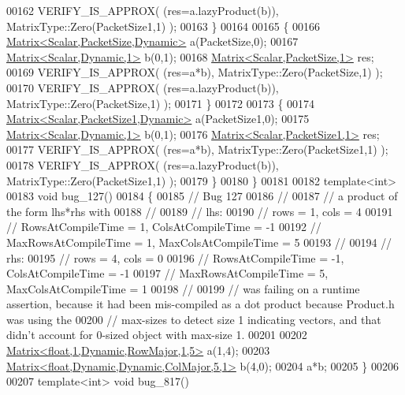 \begin{DoxyCode}
00162     VERIFY\_IS\_APPROX( (res=a.lazyProduct(b)), MatrixType::Zero(PacketSize1,1) );
00163   \}
00164   
00165   \{
00166     \hyperlink{group___core___module_class_eigen_1_1_matrix}{Matrix<Scalar,PacketSize,Dynamic>} a(PacketSize,0);
00167     \hyperlink{group___core___module}{Matrix<Scalar,Dynamic,1>} b(0,1);
00168     \hyperlink{group___core___module_class_eigen_1_1_matrix}{Matrix<Scalar,PacketSize,1>} res;
00169     VERIFY\_IS\_APPROX( (res=a*b), MatrixType::Zero(PacketSize,1) );
00170     VERIFY\_IS\_APPROX( (res=a.lazyProduct(b)), MatrixType::Zero(PacketSize,1) );
00171   \}
00172   
00173   \{
00174     \hyperlink{group___core___module_class_eigen_1_1_matrix}{Matrix<Scalar,PacketSize1,Dynamic>} a(PacketSize1,0);
00175     \hyperlink{group___core___module}{Matrix<Scalar,Dynamic,1>} b(0,1);
00176     \hyperlink{group___core___module_class_eigen_1_1_matrix}{Matrix<Scalar,PacketSize1,1>} res;
00177     VERIFY\_IS\_APPROX( (res=a*b), MatrixType::Zero(PacketSize1,1) );
00178     VERIFY\_IS\_APPROX( (res=a.lazyProduct(b)), MatrixType::Zero(PacketSize1,1) );
00179   \}
00180 \}
00181 
00182 \textcolor{keyword}{template}<\textcolor{keywordtype}{int}>
00183 \textcolor{keywordtype}{void} bug\_127()
00184 \{
00185   \textcolor{comment}{// Bug 127}
00186   \textcolor{comment}{//}
00187   \textcolor{comment}{// a product of the form lhs*rhs with}
00188   \textcolor{comment}{//}
00189   \textcolor{comment}{// lhs:}
00190   \textcolor{comment}{// rows = 1, cols = 4}
00191   \textcolor{comment}{// RowsAtCompileTime = 1, ColsAtCompileTime = -1}
00192   \textcolor{comment}{// MaxRowsAtCompileTime = 1, MaxColsAtCompileTime = 5}
00193   \textcolor{comment}{//}
00194   \textcolor{comment}{// rhs:}
00195   \textcolor{comment}{// rows = 4, cols = 0}
00196   \textcolor{comment}{// RowsAtCompileTime = -1, ColsAtCompileTime = -1}
00197   \textcolor{comment}{// MaxRowsAtCompileTime = 5, MaxColsAtCompileTime = 1}
00198   \textcolor{comment}{//}
00199   \textcolor{comment}{// was failing on a runtime assertion, because it had been mis-compiled as a dot product because
       Product.h was using the}
00200   \textcolor{comment}{// max-sizes to detect size 1 indicating vectors, and that didn't account for 0-sized object with
       max-size 1.}
00201 
00202   \hyperlink{group___core___module_class_eigen_1_1_matrix}{Matrix<float,1,Dynamic,RowMajor,1,5>} a(1,4);
00203   \hyperlink{group___core___module_class_eigen_1_1_matrix}{Matrix<float,Dynamic,Dynamic,ColMajor,5,1>} b(4,0);
00204   a*b;
00205 \}
00206 
00207 \textcolor{keyword}{template}<\textcolor{keywordtype}{int}> \textcolor{keywordtype}{void} bug\_817()

\end{DoxyCode}
